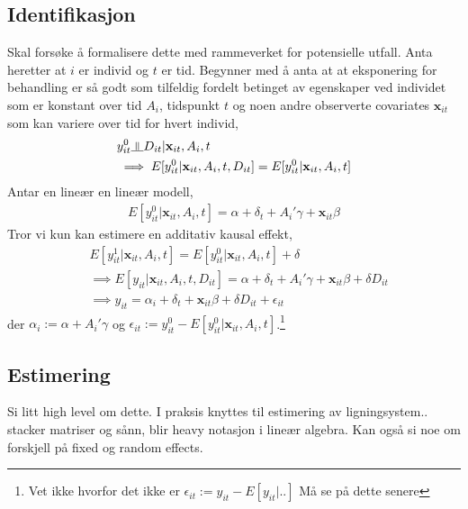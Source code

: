 \subsection{Identifikasjon}
 Skal forsøke å formalisere dette med rammeverket for potensielle utfall. Anta heretter at $i$ er individ og $t$ er tid. Begynner med å anta at at eksponering for behandling er så godt som tilfeldig fordelt betinget av egenskaper ved individet som er konstant over tid $A_i$, tidspunkt $t$ og noen andre observerte covariates $\mathbf{x}_{it}$ som kan variere over tid for hvert individ,
\begin{align}
&y_{it}^0 \indep D_{it}|\mathbf{x}_{it},A_i,t \\
& \implies E[y_{it}^0|\mathbf{x}_{it},A_i,t,D_{it}] = E[y_{it}^0|\mathbf{x}_{it},A_i,t]
\end{align}
Antar en lineær en lineær modell,
\begin{align}
E[y_{it}^0|\mathbf{x}_{it},A_i,t] = \alpha + \delta_t+A_i'\gamma+\mathbf{x}_{it}\beta
\end{align}
Tror vi kun kan estimere en additativ kausal effekt,
\begin{align}
&E[y_{it}^1|\mathbf{x}_{it},A_i,t] = E[y_{it}^0|\mathbf{x}_{it},A_i,t]+\delta \\
&\implies E[y_{it}|\mathbf{x}_{it},A_i,t,D_{it}] = \alpha + \delta_t+A_i'\gamma+\mathbf{x}_{it}\beta + \delta D_{it} \\
&\implies y_{it} = \alpha_i + \delta_t+\mathbf{x}_{it}\beta + \delta D_{it} + \epsilon_{it}
\end{align}
der $\alpha_i := \alpha + A_i' \gamma$ og $\epsilon_{it} := y_{it}^0-E[y_{it}^0|\mathbf{x}_{it},A_i,t]$.\footnote{Vet ikke hvorfor det ikke er $\epsilon_{it} := y_{it}-E[y_{it}|..]$ Må se på dette senere} 
\subsection{Estimering}
Si litt high level om dette. I praksis knyttes til estimering av ligningsystem.. stacker matriser og sånn, blir heavy notasjon i lineær algebra. Kan også si noe om forskjell på fixed og random effects.
